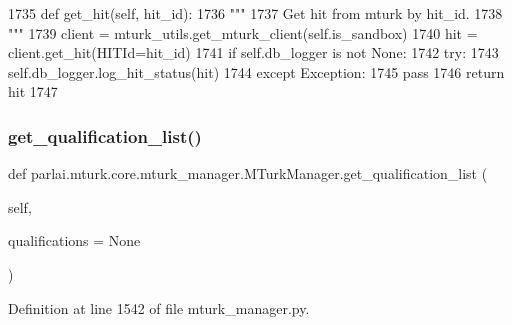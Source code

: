 \begin{DoxyCode}
1735     \textcolor{keyword}{def }get\_hit(self, hit\_id):
1736         \textcolor{stringliteral}{"""}
1737 \textcolor{stringliteral}{        Get hit from mturk by hit\_id.}
1738 \textcolor{stringliteral}{        """}
1739         client = mturk\_utils.get\_mturk\_client(self.is\_sandbox)
1740         hit = client.get\_hit(HITId=hit\_id)
1741         \textcolor{keywordflow}{if} self.db\_logger \textcolor{keywordflow}{is} \textcolor{keywordflow}{not} \textcolor{keywordtype}{None}:
1742             \textcolor{keywordflow}{try}:
1743                 self.db\_logger.log\_hit\_status(hit)
1744             \textcolor{keywordflow}{except} Exception:
1745                 \textcolor{keywordflow}{pass}
1746         \textcolor{keywordflow}{return} hit
1747 
\end{DoxyCode}
\mbox{\label{classparlai_1_1mturk_1_1core_1_1mturk__manager_1_1MTurkManager_a3466e2c936edfc55727d1bd3ac71cfb6}} 
\subsubsection{\texorpdfstring{get\+\_\+qualification\+\_\+list()}{get\_qualification\_list()}}
{\footnotesize\ttfamily def parlai.\+mturk.\+core.\+mturk\+\_\+manager.\+M\+Turk\+Manager.\+get\+\_\+qualification\+\_\+list (\begin{DoxyParamCaption}\item[{}]{self,  }\item[{}]{qualifications = {\ttfamily None} }\end{DoxyParamCaption})}



Definition at line 1542 of file mturk\+\_\+manager.\+py.


